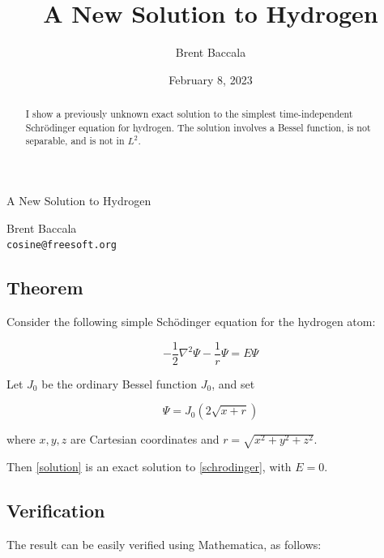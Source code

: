 \documentclass{article}
\title{A New Solution to Hydrogen}
\author{Brent Baccala}
\date{February 8, 2023}
\begin{document}
\parindent 0pt

\begin{center}
\Large
A New Solution to Hydrogen
\end{center}

\begin{center}
Brent Baccala \\
\verb+cosine@freesoft.org+
\end{center}

\begin{abstract}
I show a previously unknown exact solution to the simplest time-independent Schr\"odinger equation for hydrogen.
The solution involves a Bessel function, is not separable, and is not in $L^2$.
\end{abstract}

\subsection*{Theorem}

Consider the following simple Sch\"odinger equation for the hydrogen atom:

\begin{equation}
\label{schrodinger}
-\frac{1}{2}\nabla^2 \Psi - \frac{1}{r}\Psi = E \Psi
\end{equation}

Let $J_0$ be the ordinary Bessel function $J_0$, and set

\begin{equation}
\label{solution}
\Psi = J_0(2\sqrt{x+r})
\end{equation}

where $x,y,z$ are Cartesian coordinates and $r=\sqrt{x^2+y^2+z^2}$.

\vskip 12pt

Then \eqref{solution} is an exact solution to \eqref{schrodinger}, with $E=0$.

\subsection*{Verification}

The result can be easily verified using Mathematica, as follows:
\end{document}
